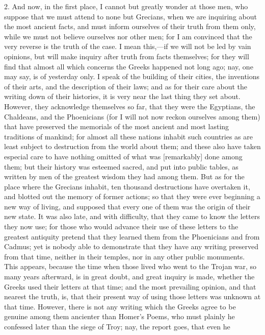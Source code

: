 2. And now, in the first place, I cannot but greatly wonder at those men,
who suppose that we must attend to none but Grecians, when we are
inquiring about the most ancient facts, and must inform ourselves of their
truth from them only, while we must not believe ourselves nor other men;
for I am convinced that the very reverse is the truth of the case. I mean
this,—if we will not be led by vain opinions, but will make inquiry
after truth from facts themselves; for they will find that almost all
which concerns the Greeks happened not long ago; nay, one may say, is of
yesterday only. I speak of the building of their cities, the inventions of
their arts, and the description of their laws; and as for their care about
the writing down of their histories, it is very near the last thing they
set about. However, they acknowledge themselves so far, that they were the
Egyptians, the Chaldeans, and the Phoenicians (for I will not now reckon
ourselves among them) that have preserved the memorials of the most
ancient and most lasting traditions of mankind; for almost all these
nations inhabit such countries as are least subject to destruction from
the world about them; and these also have taken especial care to have
nothing omitted of what was [remarkably] done among them; but their
history was esteemed sacred, and put into public tables, as written by men
of the greatest wisdom they had among them. But as for the place where the
Grecians inhabit, ten thousand destructions have overtaken it, and blotted
out the memory of former actions; so that they were ever beginning a new
way of living, and supposed that every one of them was the origin of their
new state. It was also late, and with difficulty, that they came to know
the letters they now use; for those who would advance their use of these
letters to the greatest antiquity pretend that they learned them from the
Phoenicians and from Cadmus; yet is nobody able to demonstrate that they
have any writing preserved from that time, neither in their temples, nor
in any other public monuments. This appears, because the time when those
lived who went to the Trojan war, so many years afterward, is in great
doubt, and great inquiry is made, whether the Greeks used their letters at
that time; and the most prevailing opinion, and that nearest the truth,
is, that their present way of using those letters was unknown at that
time. However, there is not any writing which the Greeks agree to be
genuine among them ancienter than Homer's Poems, who must plainly he
confessed later than the siege of Troy; nay, the report goes, that even he
